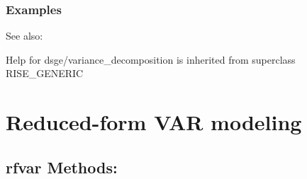 \documentclass[letterpaper,10pt,english]{sphinxmanual}
\begin{document}
\subsection{Examples}
\label{classes/models/@dsge/dsge:id244}
See also:

Help for dsge/variance\_decomposition is inherited from superclass RISE\_GENERIC


\chapter{Reduced-form VAR modeling}
\label{classes/models/@rfvar/rfvar::doc}\label{classes/models/@rfvar/rfvar:reduced-form-var-modeling}

\section{rfvar Methods:}
\end{document}
